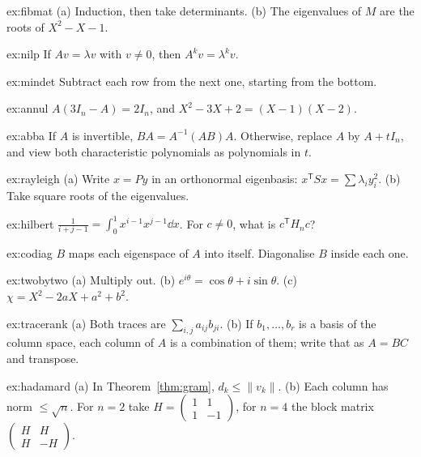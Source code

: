 \begin{hint}{ex:fibmat}
(a) Induction, then take determinants. (b) The eigenvalues of $M$ are the roots of $X^2-X-1$.
\end{hint}
\begin{hint}{ex:nilp}
If $Av=\lambda v$ with $v\ne0$, then $A^kv=\lambda^kv$.
\end{hint}
\begin{hint}{ex:mindet}
Subtract each row from the next one, starting from the bottom.
\end{hint}
\begin{hint}{ex:annul}
$A(3I_n-A)=2I_n$, and $X^2-3X+2=(X-1)(X-2)$.
\end{hint}
\begin{hint}{ex:abba}
If $A$ is invertible, $BA=A^{-1}(AB)A$. Otherwise, replace $A$ by $A+tI_n$, and view both characteristic polynomials as polynomials in $t$.
\end{hint}
\begin{hint}{ex:rayleigh}
(a) Write $x=Py$ in an orthonormal eigenbasis: $x^{\mathsf T}Sx=\sum\lambda_iy_i^2$. (b) Take square roots of the eigenvalues.
\end{hint}
\begin{hint}{ex:hilbert}
$\frac1{i+j-1}=\int_0^1x^{i-1}x^{j-1}\dd x$. For $c\ne0$, what is $c^{\mathsf T}H_nc$?
\end{hint}
\begin{hint}{ex:codiag}
$B$ maps each eigenspace of $A$ into itself. Diagonalise $B$ inside each one.
\end{hint}
\begin{hint}{ex:twobytwo}
(a) Multiply out. (b) $e^{i\theta}=\cos\theta+i\sin\theta$. (c) $\chi=X^2-2aX+a^2+b^2$.
\end{hint}
\begin{hint}{ex:tracerank}
(a) Both traces are $\sum_{i,j}a_{ij}b_{ji}$. (b) If $b_1,\dots,b_r$ is a basis of the column space, each column of $A$ is a combination of them; write that as $A=BC$ and transpose.
\end{hint}
\begin{hint}{ex:hadamard}
(a) In Theorem~\ref{thm:gram}, $d_k\le\|v_k\|$. (b) Each column has norm $\le\sqrt n$. For $n=2$ take $H=\begin{pmatrix}1&1\\1&-1\end{pmatrix}$, for $n=4$ the block matrix $\begin{pmatrix}H&H\\H&-H\end{pmatrix}$.
\end{hint}
